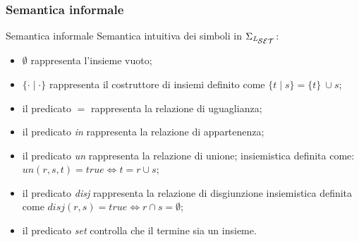 \documentclass{beamer}
\begin{document}

\begin{frame}
  \frametitle{Semantica informale}
  \begin{block}{Semantica informale}
    Semantica intuitiva dei simboli in $\Sigma_{\textit{L}\textsubscript{\ensuremath{\mathcal{S}}\ensuremath{\mathcal{E}}\ensuremath{\mathcal{T}}}}$:
    \begin{itemize}
    \item $\emptyset$ rappresenta l’insieme vuoto;
    \item $\{\cdot\mid\cdot\}$ rappresenta il costruttore di insiemi
      definito come $\{t\mid s\} = \{t\}\ \cup s$;
    \item il predicato $=$ rappresenta la relazione di uguaglianza;
    \item il predicato \textit{in} rappresenta la relazione di
      appartenenza;
    \item il predicato \textit{un} rappresenta la relazione di unione;
      insiemistica definita come: $un(r,s,t) = true
      \Longleftrightarrow t = r \cup s$;
    \item il predicato \textit{disj} rappresenta la relazione di
      disgiunzione insiemistica definita come $disj(r,s) = true
      \Longleftrightarrow r \cap s = \emptyset$;
    \item il predicato \textit{set} controlla che il termine sia un
      insieme.
    \end{itemize}
  \end{block}
\end{frame}

\end{document}
